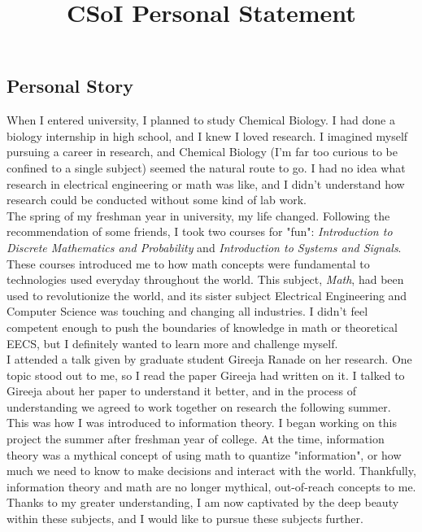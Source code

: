 \documentclass[10pt]{article}
\title{\vspace{-5ex} CSoI Personal Statement}
\author{\Name \vspace{-2ex}}
\date{}
\begin{document}
\maketitle



\subsection*{Personal Story}
When I entered university, I planned to study Chemical Biology. I had done a biology internship in high school, and I knew I loved research. I imagined myself pursuing a career in research, and Chemical Biology (I'm far too curious to be confined to a single subject) seemed the natural route to go. I had no idea what research in electrical engineering or math was like, and I didn't understand how research could be conducted without some kind of lab work.\\

The spring of my freshman year in university, my life changed. Following the recommendation of some friends, I took two courses for "fun": \textit{Introduction to Discrete Mathematics and Probability} and \textit{Introduction to Systems and Signals}. These courses introduced me to how math concepts were fundamental to technologies used everyday throughout the world. This subject, \textit{Math}, had been used to revolutionize the world, and its sister subject Electrical Engineering and Computer Science was touching and changing all industries. I didn't feel competent enough to push the boundaries of knowledge in math or theoretical EECS, but I definitely wanted to learn more and challenge myself.\\

I attended a talk given by graduate student Gireeja Ranade on her research. One topic stood out to me, so I read the paper Gireeja had written on it. I talked to Gireeja about her paper to understand it better, and in the process of understanding we agreed to work together on research the following summer. This was how I was introduced to information theory. I began working on this project the summer after freshman year of college. At the time, information theory was a mythical concept of using math to quantize "information", or how much we need to know to make decisions and interact with the world. Thankfully, information theory and math are no longer mythical, out-of-reach concepts to me. Thanks to my greater understanding, I am now captivated by the deep beauty within these subjects, and I would like to pursue these subjects further.\\
\end{document}
